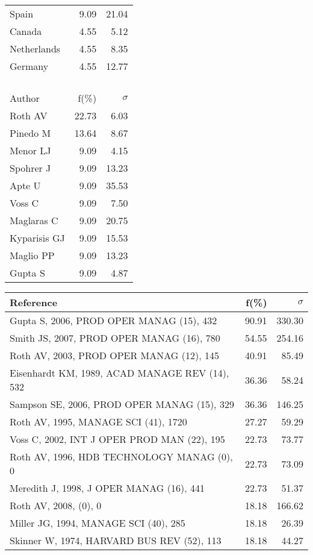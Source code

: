 \documentclass[a4paper,11pt]{report}
\begin{document}
\begin{landscape}
\begin{table}[!ht]
{\begin{tabular}{|l r r|}
Spain & 9.09 & 21.04\\
Canada & 4.55 & 5.12\\
Netherlands & 4.55 & 8.35\\
Germany & 4.55 & 12.77\\
 &  & \\
 &  & \\
 &  & \\
 &  & \\
\hline
\hline
Author & f(\%) & $\sigma$\\
\hline
Roth AV & 22.73 & 6.03\\
Pinedo M & 13.64 & 8.67\\
Menor LJ & 9.09 & 4.15\\
Spohrer J & 9.09 & 13.23\\
Apte U & 9.09 & 35.53\\
Voss C & 9.09 & 7.50\\
Maglaras C & 9.09 & 20.75\\
Kyparisis GJ & 9.09 & 15.53\\
Maglio PP & 9.09 & 13.23\\
Gupta S & 9.09 & 4.87\\
\hline
\end{tabular}
}
{\scriptsize\begin{tabular}{|l r r|}
\hline
Reference & f(\%) & $\sigma$\\
\hline
Gupta S, 2006, PROD OPER MANAG (15), 432 & 90.91 & 330.30\\
Smith JS, 2007, PROD OPER MANAG (16), 780 & 54.55 & 254.16\\
Roth AV, 2003, PROD OPER MANAG (12), 145 & 40.91 & 85.49\\
Eisenhardt KM, 1989, ACAD MANAGE REV (14), 532 & 36.36 & 58.24\\
Sampson SE, 2006, PROD OPER MANAG (15), 329 & 36.36 & 146.25\\
Roth AV, 1995, MANAGE SCI (41), 1720 & 27.27 & 59.29\\
Voss C, 2002, INT J OPER PROD MAN (22), 195 & 22.73 & 73.77\\
Roth AV, 1996, HDB TECHNOLOGY MANAG (0), 0 & 22.73 & 73.09\\
Meredith J, 1998, J OPER MANAG (16), 441 & 22.73 & 51.37\\
Roth AV, 2008,  (0), 0 & 18.18 & 166.62\\
Miller JG, 1994, MANAGE SCI (40), 285 & 18.18 & 26.39\\
Skinner W, 1974, HARVARD BUS REV (52), 113 & 18.18 & 44.27\\

\end{tabular}}
\end{table}
\end{landscape}
\end{document}
